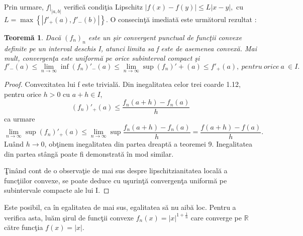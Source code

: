 \documentclass[a4paper,12pt,oneside]{report}
\newtheorem{theorem}{Teorem\u a}
\begin{document}
Prin urmare, \(f|_{\left | a,b \right |}\) verific\u{a} condi\c{t}ia Lipschitz \(\left | f\left ( x \right )  - f\left ( y \right )\right |\leq L\left | x-y \right |,\) cu \(L=\max \left \{ \left | {f}'_{+} \left ( a \right ),{f}'_{-} \left ( b \right ) \right | \right \}\). O consecin\c{t}\u{a} imediat\u{a} este urm\u{a}torul rezultat :

\begin{theorem}
Dac\u{a} \(\left ( f_{n} \right )_{n}\) este un \c{s}ir convergent punctual de func\c{t}ii convexe definite pe un interval deschis I, atunci limita sa f este de asemenea convex\u{a}. Mai mult, convergen\c{t}a este uniform\u{a} pe orice subinterval compact \c{s}i
\begin{displaymath}
   {f}'_{-}\left ( a \right ) \leq \lim_{n\rightarrow \infty } \inf {\left (f_{n}  \right )}'_{-}\left ( a \right )\leq \lim_{n\rightarrow \infty }\sup {\left (f_{n}  \right )}' + \left ( a \right ) \leq {f}'_{+}\left ( a \right ), ~pentru ~orice~ a~ \in I.
\end{displaymath}
\end{theorem}
\begin{proof}
Convexitatea lui f este trivial\u{a}. Din inegalitatea celor trei coarde 1.12, pentru orice \(h >  0\) cu \(a + h \in I\),
\begin{displaymath}
   {\left (f_{n}  \right )}'_{+}\left ( a \right ) \leq  \frac{f_{n}\left ( a + h \right ) - f_{n}\left ( a \right )}{h}
\end{displaymath}
ca urmare
\begin{displaymath}
   \lim_{n\rightarrow \infty } \sup {\left ( f_{n} \right )}'_{+}\left ( a \right ) \leq \lim_{n\rightarrow \infty } \sup \frac{f_{n}\left ( a + h \right ) - f_{n}\left ( a \right )}{h} = \frac{f\left ( a + h \right ) - f\left ( a \right )}{h}.
\end{displaymath}
Lu\^{a}nd \(h\rightarrow 0\), ob\c{t}inem inegalitatea din partea dreapt\u{a} a teoremei 9. Inegalitatea din partea st\^{a}ng\u{a} poate fi demonstrat\u{a} \^{i}n mod similar. 

\c{T}in\^{a}nd cont de o observa\c{t}ie de mai sus despre lipschitzianitatea local\u{a} a  func\c{t}iilor convexe, se poate deduce cu u\c{s}urin\c{t}\u{a} convergen\c{t}a uniform\u{a} pe subintervale compacte ale lui I.
\end{proof}
Este posibil, ca \^{i}n egalitatea de mai sus, egalitatea s\u{a} nu aib\u{a} loc. Pentru a verifica asta, lu\u{a}m \c{s}irul de func\c{t}ii convexe \(f_{n}\left ( x \right ) = \left | x \right |^{1 + \frac{1}{n}}\) care converge pe \(\mathbb{R}\) c\u{a}tre func\c{t}ia \(f\left ( x  \right ) = \left | x \right |.\) 
\end{document}
